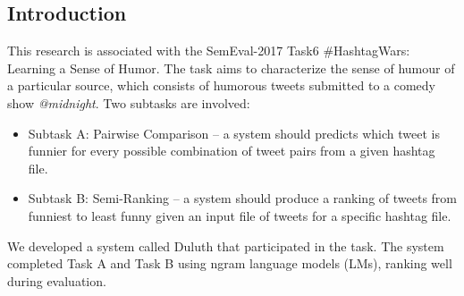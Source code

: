 \documentclass[a0,portrait]{a0poster}
\begin{document}
\begin{multicols}{2} %



 


\color{SaddleBrown} %

\section*{\LARGE Introduction}
This research is associated with the SemEval-2017 Task6 \#HashtagWars: Learning a Sense of Humor. The task aims to characterize the sense of humour of a particular source, which consists of humorous tweets submitted to a comedy show \textit{@midnight}. Two subtasks are involved: 
\begin{itemize}
\item Subtask A: Pairwise Comparison -- a system should predicts which tweet is funnier for every possible combination of tweet pairs from a given hashtag file.
\item Subtask B: Semi-Ranking -- a system should produce a ranking of tweets from funniest to least funny given an input file of tweets for a specific hashtag file. 
\end{itemize}
We developed a system called Duluth that participated in the task. The system completed Task A and Task B using ngram language models (LMs), ranking well during evaluation.


\color{DarkSlateGray} %


\end{multicols}
\end{document}
